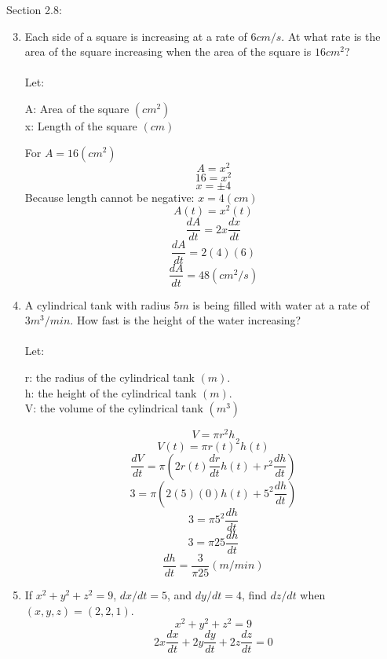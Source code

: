 \documentclass[12pt]{article}
\begin{document}
Section 2.8:

\begin{enumerate}
\setcounter{enumi}{2}   

    \item Each side of a square is increasing at a rate of $6cm/s$. At what rate is the area of the square increasing when the area of the square is $16cm^2$?\\~\\
        Let:
        \begin{center}
            A: Area of the square $(cm^2)$\\
            x: Length of the square $(cm)$
        \end{center}
        For $A = 16(cm^2)$
        \[A = x^2\]
        \[16 = x^2\]
        \[x = \pm 4\]
        Because length cannot be negative: $x = 4(cm)$
        \[A(t) = x^2(t)\]
        \[\frac{dA}{dt} = 2x \frac{dx}{dt}\]
        \[\frac{dA}{dt} = 2(4)(6)\]
        \[\boxed{\frac{dA}{dt} = 48 (cm^2/s)}\]
        \noindent{}
    \setcounter{enumi}{6}
    \item A cylindrical tank with radius $5m$ is being filled with water at a rate of $3m^3/min$. How fast is the height of the water increasing?\\~\\
    Let:
    \begin{center}
        r: the radius of the cylindrical tank $(m)$.\\
        h: the height of the cylindrical tank $(m)$.\\
        V: the volume of the cylindrical tank $(m^3)$
    \end{center}
    \[V = \pi r^2 h\]
    \[V(t) = \pi r(t)^2 h(t)\]
    \[\frac{dV}{dt} = \pi (2r(t)\frac{dr}{dt}h(t) + r^2 \frac{dh}{dt})\]    
    \[3 = \pi (2(5)(0)h(t) + 5^2 \frac{dh}{dt})\]    
    \[3 = \pi 5^2 \frac{dh}{dt}\]    
    \[3 = \pi 25 \frac{dh}{dt}\]    
    \[\boxed{\frac{dh}{dt} = \frac{3}{\pi 25}(m/min)}\]    
    \noindent{}
    \setcounter{enumi}{9}
    \item If $x^2+y^2+z^2 = 9$, $dx/dt = 5$, and $dy/dt = 4$, find $dz/dt$ when $(x,y,z) = (2,2,1)$.
    \[x^2+y^2+z^2 = 9\]
    \[2x\frac{dx}{dt}+2y\frac{dy}{dt}+2z\frac{dz}{dt} = 0\]

\end{enumerate}
\end{document}
